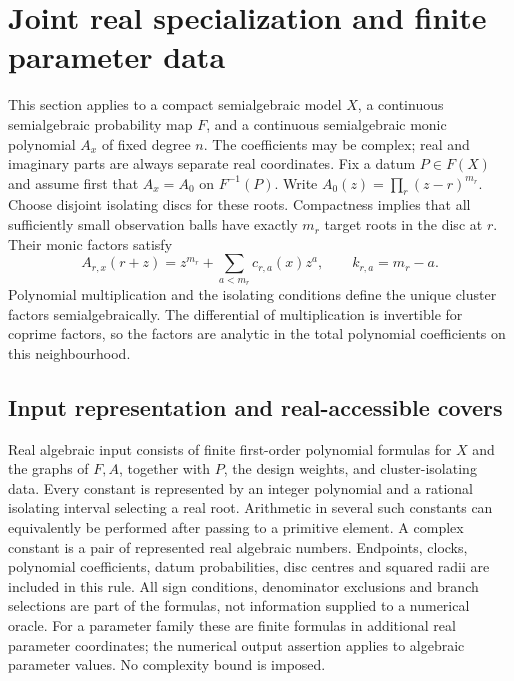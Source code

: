 \section{Joint real specialization and finite parameter data}\label{sec:real}
This section applies to a compact semialgebraic model $X$, a continuous
semialgebraic probability map $F$, and a continuous semialgebraic monic
polynomial $A_x$ of fixed degree $n$. The coefficients may be complex;
real and imaginary parts are always separate real coordinates. Fix a datum
$P\in F(X)$ and assume first that $A_x=A_0$ on $F^{-1}(P)$. Write
$A_0(z)=\prod_r(z-r)^{m_r}$. Choose disjoint isolating discs for these
roots. Compactness implies that all sufficiently small observation balls
have exactly $m_r$ target roots in the disc at $r$. Their monic factors
satisfy
\begin{equation}\label{eq:clusters}
 A_{r,x}(r+z)=z^{m_r}+\sum_{a<m_r}c_{r,a}(x)z^a,
 \qquad k_{r,a}=m_r-a.
\end{equation}
Polynomial multiplication and the isolating conditions define the unique
cluster factors semialgebraically. The differential of multiplication is
invertible for coprime factors, so the factors are analytic in the total
polynomial coefficients on this neighbourhood.

\subsection{Input representation and real-accessible covers}
\begin{definition}\label{def:input}
Real algebraic input consists of finite first-order polynomial formulas for
$X$ and the graphs of $F,A$, together with $P$, the design weights, and
cluster-isolating data. Every constant is represented by an integer
polynomial and a rational isolating interval selecting a real root.
Arithmetic in several such constants can equivalently be performed after
passing to a primitive element. A complex constant is a pair of represented
real algebraic numbers. Endpoints, clocks, polynomial coefficients, datum
probabilities, disc centres and squared radii are included in this rule.
All sign conditions, denominator exclusions and branch selections are
part of the formulas, not information supplied to a numerical oracle.
For a parameter family these are finite formulas in additional real
parameter coordinates; the numerical output assertion applies to algebraic
parameter values. No complexity bound is imposed.
\end{definition}

